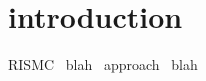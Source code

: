 \section{introduction}
\label{sec:introduction}

RISMC~\cite{Feynman1963118} blah~\cite{Instance1290} approach~\cite{Dirac1953888} blah~\cite{test}